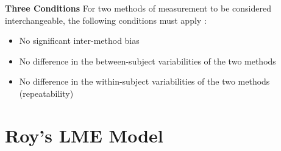 \documentclass[compress]{beamer}        %
\makeatletter
\newcommand{\tcb}{\textcolor{beamer@blendedblue}}
\makeatother
\begin{document}
		
		\begin{frame}{\bf \tcb{Three Conditions}}
			\Large
			For two methods of measurement to be considered interchangeable, the following conditions must apply \cite{Roy2009}:
			\\
			\begin{itemize}\itemsep0.5cm
				\item No significant inter-method bias
				\item No difference in the between-subject variabilities of the two methods
				\item No difference in the within-subject variabilities of the two methods (repeatability)
			\end{itemize}
		\end{frame}
	
		\section[Roy's LME Model]{Roy's LME Model}
\end{document}

